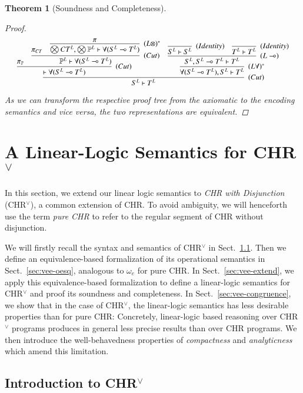 \documentclass[acmtocl]{acmtrans2m}
\newtheorem{theorem}{Theorem}[section]
\newcommand{\bbP}{\ensuremath{\mathbb{P}}}
\newcommand{\oesq}{\ensuremath{\omega_{e}}}
\newcommand{\lp}{\multimap}
\begin{document}
\begin{theorem}[Soundness and Completeness]
\begin{proof}
  \[
  	\small
	\infer[(Cut)]
	{
		S^L \vdash T^L
 	}
 	{
		\infer[(Cut)]
		{
			\vdash \forall(S^L\lp T^L)
		}
		{
			\pi_{\bbP}
		&
			\infer[(Cut)]
			{
				\bbP^L \vdash \forall(S^L\lp T^L)
			}
			{
				\pi_{CT}
			&
				\infer[(L\otimes)^{*}]
				{
					\bigotimes CT^L, \bigotimes \bbP^L \vdash \forall(S^L\lp T^L)
				}
				{
					\pi
				}
			}
		}
	&
		\infer[(L\forall)^{*}]
		{
			\forall(S^L\lp T^L), S^L\vdash T^L
		}
		{
			\infer[(L\lp)]
			{
				S^L, S^L\lp T^L\vdash T^L
			}
			{
				\infer[(Identity)]
				{
					S^L \vdash S^L
				}
				{
				}
			&
				\infer[(Identity)]
				{
					T^L \vdash T^L
				}
				{
				}
			}
		}
 	}
  \]

As we can transform the respective proof tree from the axiomatic to the
encoding semantics and vice versa, the two representations are equivalent.
\end{proof}
\end{theorem}



\section{A Linear-Logic Semantics for CHR$^\vee$}
  \label{sec:chrv}

In this section, we extend our linear logic semantics to \emph{CHR with
Disjunction} (CHR$^\vee$), a common extension of CHR. To avoid ambiguity, we
will henceforth use the term \emph{pure CHR} to refer to the regular segment of
CHR without disjunction.

We will firstly recall the syntax and semantics of CHR$^\vee$ in
Sect.~\ref{sec:vee-intro}. Then we define an equivalence-based formalization of
its operational semantics in Sect.~\ref{sec:vee-oesq}, analogous to $\oesq$ for
pure CHR. In Sect.~\ref{sec:vee-extend}, we apply this equivalence-based
formalization to define a linear-logic semantics for CHR$^\vee$ and proof its soundness and
completeness. In Sect.~\ref{sec:vee-congruence}, we show that in the case of
CHR$^\vee$, the linear-logic semantics has less desirable properties than for
pure CHR: Concretely, linear-logic based reasoning over CHR$^\vee$
programs produces in general less precise results than over CHR programs. We
then introduce the well-behavedness properties of \emph{compactness} and
\emph{analyticness} which amend this limitation.

\subsection{Introduction to CHR$^\vee$}
\label{sec:vee-intro}
\end{document}
